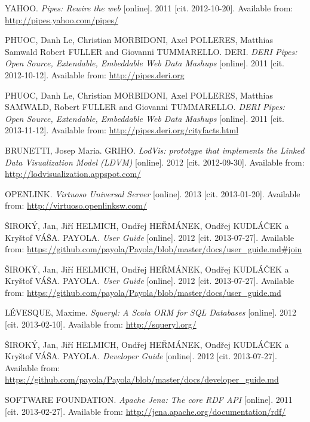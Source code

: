 \begin{thebibliography}{99}
{\sc YAHOO.}
\emph{Pipes: Rewire the web} [online]. 2011 [cit. 2012-10-20].
Available from: \url{http://pipes.yahoo.com/pipes/}

{\sc PHUOC,} Danh Le, Christian MORBIDONI, Axel POLLERES,
Matthias Samwald Robert FULLER and Giovanni TUMMARELLO. DERI.
\emph{DERI Pipes: Open Source, Extendable, Embeddable Web Data Mashups} [online].
2011 [cit. 2012-10-12]. 
Available from: \url{http://pipes.deri.org}

{\sc PHUOC,} Danh Le, Christian MORBIDONI, Axel POLLERES,
Matthias SAMWALD, Robert FULLER and Giovanni TUMMARELLO.
\emph{DERI Pipes: Open Source, Extendable, Embeddable Web Data Mashups} [online]. 2011
[cit. 2013-11-12].
Available from: \url{http://pipes.deri.org/cityfacts.html}

{\sc BRUNETTI,} Josep Maria. GRIHO.
\emph{LodVis: prototype that implements the Linked Data Visualization Model (LDVM)}
[online]. 2012 [cit. 2012-09-30].
Available from: \url{http://lodvisualization.appspot.com/}

{\sc OPENLINK.}
\emph{Virtuoso Universal Server} [online]. 2013 [cit. 2013-01-20].
Available from: \url{http://virtuoso.openlinksw.com/}

{\sc ŠIROKÝ,} Jan, Jiří HELMICH, Ondřej HEŘMÁNEK, Ondřej KUDLÁČEK a Kryštof VÁŠA. PAYOLA.
\emph{User Guide} [online]. 2012 [cit. 2013-07-27]. 
Available from: \url{https://github.com/payola/Payola/blob/master/docs/user_guide.md#join}

{\sc ŠIROKÝ,} Jan, Jiří HELMICH, Ondřej HEŘMÁNEK, Ondřej KUDLÁČEK a Kryštof VÁŠA. PAYOLA.
\emph{User Guide} [online]. 2012 [cit. 2013-07-27]. 
Available from: \url{https://github.com/payola/Payola/blob/master/docs/user_guide.md}

{\sc LÉVESQUE,} Maxime. 
\emph{Squeryl: A Scala ORM for SQL Databases} [online]. 2012 [cit. 2013-02-10].
Available from: \url{http://squeryl.org/}

{\sc ŠIROKÝ,} Jan, Jiří HELMICH, Ondřej HEŘMÁNEK, Ondřej KUDLÁČEK a Kryštof VÁŠA. PAYOLA.
\emph{Developer Guide} [online]. 2012 [cit. 2013-07-27]. 
Available from: \url{https://github.com/payola/Payola/blob/master/docs/developer_guide.md}

{\scAPACHE SOFTWARE FOUNDATION.} 
\emph{Apache Jena: The core RDF API} [online]. 2011 [cit. 2013-02-27]. 
Available from: \url{http://jena.apache.org/documentation/rdf/}


\end{thebibliography}
